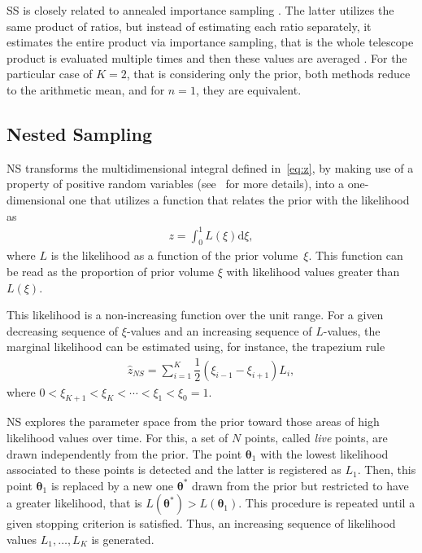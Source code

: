 \documentclass[aps,reprint,amsmath,amssymb,showpacs,showkeys]{revtex4-1}%
\begin{document}
SS is closely related to annealed importance sampling \citep[][]{Neal:2001}.  The latter utilizes the same product of ratios, but instead of estimating each ratio separately, it estimates the entire product via importance sampling, that is the whole telescope product is evaluated multiple times and then these values are averaged \citep{Maturana:2017}.  For the particular case of $K = 2$, that is considering only the prior, both methods reduce to the arithmetic mean, and for $n =1$, they are equivalent.   


\subsection{Nested Sampling}

NS transforms the multidimensional integral defined in~\eqref{eq:z}, by making use of a property of positive random variables (see~\cite{Maturana:2017b} for more details), into a one-dimensional one that utilizes a function that relates the prior with the likelihood as 
\begin{align*}
z = \int_{0}^{1} L(\xi)\text{d}\xi, 
\end{align*}
where $L$ is the likelihood as a function of the prior volume~$\xi$.  This function can be read as the proportion of prior volume $\xi$ with likelihood values greater than $L(\xi)$. 

This likelihood is a non-increasing function over the unit range.  For a given decreasing sequence of $\xi$-values and an increasing sequence of $L$-values, the marginal likelihood can be estimated using, for instance, the trapezium rule
\begin{align*}
\widehat{z}_{NS} = \sum_{i=1}^{K} \dfrac{1}{2}(\xi_{i-1} - \xi_{i+1})L_i,
\end{align*}
where $0 < \xi_{K+1} < \xi_{K} < \cdots < \xi_1<\xi_0 = 1$.

NS explores the parameter space from the prior toward those areas of high likelihood values over time.  For this, a set of $N$ points, called \textit{live} points, are drawn independently from the prior.  The point $\bm{\theta}_1$ with the lowest likelihood associated to these points is detected and the latter is registered as $L_1$.  Then, this point $\bm{\theta}_1$ is replaced by a new one $\bm{\theta}^*$ drawn from the prior but restricted to have a greater likelihood, that is $L(\bm{\theta}^*) > L(\bm{\theta}_1)$.  This procedure is repeated until a given stopping criterion is satisfied.  Thus, an increasing sequence of likelihood values $L_1, \dots, L_K$ is generated.
\end{document}
